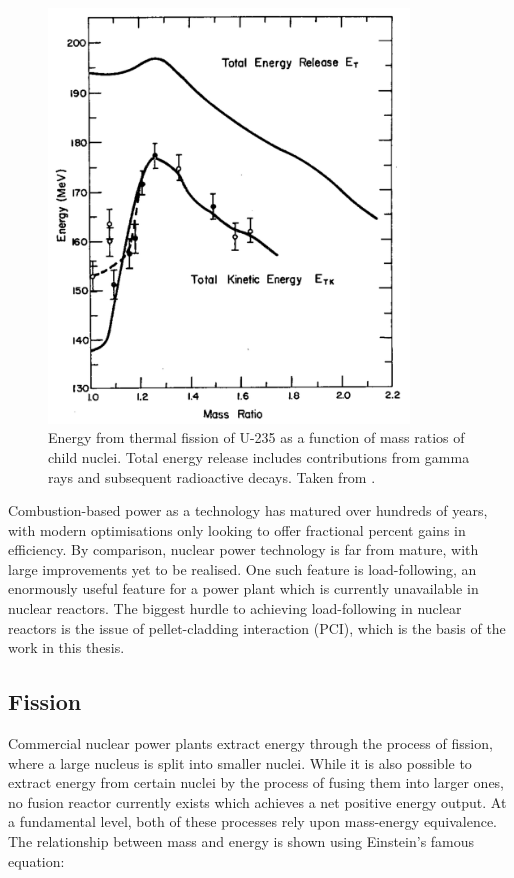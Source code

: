 \begin{figure}[htp]
\centering
\includegraphics[height=11cm]{images/fission_energy_total.png}
\caption{Energy from thermal fission of U-235 as a function of mass ratios of child nuclei. Total energy release includes contributions from gamma rays and subsequent radioactive decays. Taken from \cite{aras1965ranges}.}
\label{figure:fissionenergy}
\end{figure}

Combustion-based power as a technology has matured over hundreds of years, with modern optimisations only looking to offer fractional percent gains in efficiency. By comparison, nuclear power technology is far from mature, with large improvements yet to be realised. One such feature is load-following, an enormously useful feature for a power plant which is currently unavailable in nuclear reactors. The biggest hurdle to achieving load-following in nuclear reactors is the issue of pellet-cladding interaction (PCI), which is the basis of the work in this thesis.

\subsection{Fission}

Commercial nuclear power plants extract energy through the process of fission, where a large nucleus is split into smaller nuclei. While it is also possible to extract energy from certain nuclei by the process of fusing them into larger ones, no fusion reactor currently exists which achieves a net positive energy output. At a fundamental level, both of these processes rely upon mass-energy equivalence. The relationship between mass and energy is shown using Einstein's famous equation:

